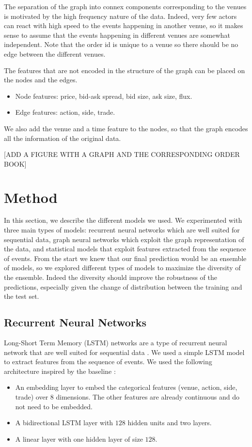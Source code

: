 \documentclass[switch, 11pt]{article}
\begin{document}
\begin{multicols}{2}
    The separation of the graph into connex components corresponding to the venues is motivated by the high frequency nature of the data. Indeed, very few actors can react with high speed to the events happening in another venue, so it makes sense to assume that the events happening in different venues are somewhat independent. Note that the order id is unique to a venue so there should be no edge between the different venues.

    The features that are not encoded in the structure of the graph can be placed on the nodes and the edges.
    \begin{itemize}
        \item Node features: price, bid-ask spread, bid size, ask size, flux.
        \item Edge features: action, side, trade.
    \end{itemize}
    We also add the venue and a time feature to the nodes, so that the graph encodes all the information of the original data.

        [ADD A FIGURE WITH A GRAPH AND THE CORRESPONDING ORDER BOOK]

    \section{Method}

    In this section, we describe the different models we used. We experimented with three main types of models: recurrent neural networks which are well suited for sequential data, graph neural networks which exploit the graph representation of the data, and statistical models that exploit features extracted from the sequence of events. From the start we knew that our final prediction would be an ensemble of models, so we explored different types of models to maximize the diversity of the ensemble. Indeed the diversity should improve the robustness of the predictions, especially given the change of distribution between the training and the test set.

    \subsection{Recurrent Neural Networks}

    Long-Short Term Memory (LSTM) networks are a type of recurrent neural network that are well suited for sequential data \cite{hochreiter-1997}. We used a simple LSTM model to extract features from the sequence of events. We used the following architecture inspired by the baseline :
    \begin{itemize}
        \item An embedding layer to embed the categorical features (venue, action, side, trade) over $8$ dimensions. The other features are already continuous and do not need to be embedded.
        \item A bidirectional LSTM layer with $128$ hidden units and two layers.
        \item A linear layer with one hidden layer of size $128$.
    \end{itemize}


\end{multicols}
\end{document}
